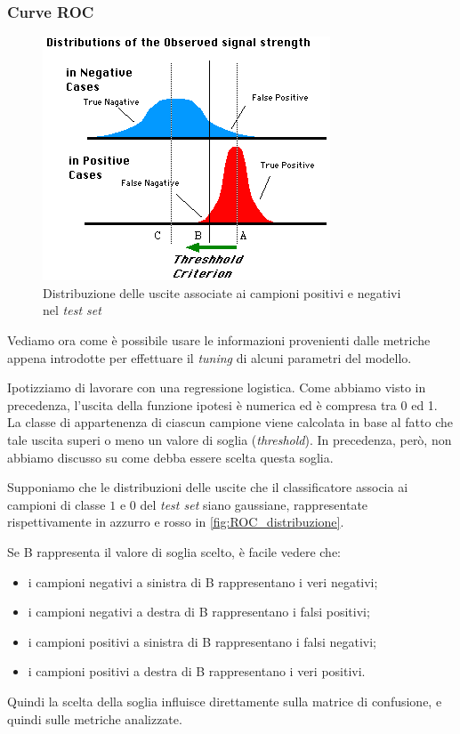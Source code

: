 \subsubsection{Curve ROC}

\begin{figure}[tbp]
\centering
  \includegraphics[width=0.5 \textwidth]{images/ROC_distribuzione}
  \caption{Distribuzione delle uscite associate ai campioni positivi e negativi nel \emph{test set}}
  \label{fig:ROC_distribuzione}
\end{figure} 
Vediamo ora come è possibile usare le informazioni provenienti dalle metriche appena introdotte per effettuare il \emph{tuning} di alcuni parametri del modello. 

Ipotizziamo di lavorare con una regressione logistica. Come abbiamo visto in precedenza, l'uscita della funzione ipotesi è numerica ed è compresa tra 0 ed 1. La classe di appartenenza di ciascun campione viene calcolata in base al fatto che tale uscita superi o meno un valore di soglia (\emph{threshold}). In precedenza, però, non abbiamo discusso su come debba essere scelta questa soglia.

Supponiamo che le distribuzioni delle uscite che il classificatore associa ai campioni di classe $1$ e $0$ del \emph{test set} siano gaussiane, rappresentate rispettivamente in azzurro e rosso in \autoref{fig:ROC_distribuzione}.


Se B rappresenta il valore di soglia scelto, è facile vedere che:
\begin{itemize}
\item i campioni negativi a sinistra di B rappresentano i veri negativi;
\item i campioni negativi a destra di B rappresentano i falsi positivi;
\item i campioni positivi a sinistra di B rappresentano i falsi negativi;
\item i campioni positivi a destra di B rappresentano i veri positivi.
\end{itemize}
Quindi la scelta della soglia influisce direttamente sulla matrice di confusione, e quindi sulle metriche analizzate. 

